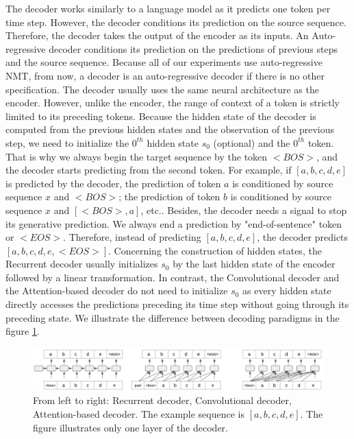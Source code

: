 The decoder works similarly to a language model as it predicts one token per time step. However, the decoder conditions its prediction on the source sequence. Therefore, the decoder takes the output of the encoder as its inputs. An Auto-regressive decoder conditions its prediction on the predictions of previous steps and the source sequence. Because all of our experiments use auto-regressive NMT, from now, a decoder is an auto-regressive decoder if there is no other specification. The decoder usually uses the same neural architecture as the encoder. However, unlike the encoder, the range of context of a token is strictly limited to its preceding tokens. Because the hidden state of the decoder is computed from the previous hidden states and the observation of the previous step, we need to initialize the $0^{th}$ hidden state $s_0$ (optional) and the $0^{th}$ token. That is why we always begin the target sequence by the token $<BOS>$, and the decoder starts predicting from the second token. For example, if $[a,b,c,d,e]$ is predicted by the decoder, the prediction of token $a$ is conditioned by source sequence $x$ and $<BOS>$; the prediction of token $b$ is conditioned by source sequence $x$ and $[<BOS>,a]$, etc.. Besides, the decoder needs a signal to stop its generative prediction. We always end a prediction by "end-of-sentence" token or $<EOS>$. Therefore, instead of predicting $[a,b,c,d,e]$, the decoder predicts $[a,b,c,d,e, <EOS>]$. Concerning the construction of hidden states, the Recurrent decoder usually initializes $s_0$ by the last hidden state of the encoder followed by a linear transformation. In contrast, the Convolutional decoder and the Attention-based decoder do not need to initialize $s_0$ as every hidden state directly accesses the predictions preceding its time step without going through its preceding state. We illustrate the difference between decoding paradigms in the figure \ref{fig:decoding}.

\begin{figure}[htbp]
\includegraphics[width=\textwidth]{graphics/decoding.png}
\caption[Illustration of 3 most popular auto-regressive decoding paradigms]{From left to right: Recurrent decoder, Convolutional decoder, Attention-based decoder. The example sequence is $[a,b,c,d,e]$. The figure illustrates only one layer of the decoder.}
\label{fig:decoding}
\end{figure}

